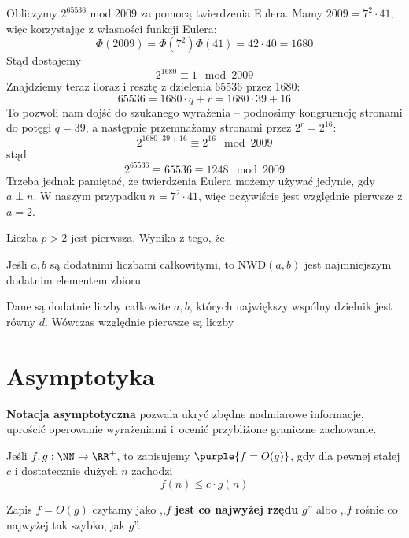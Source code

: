 \begin{example}
    Obliczymy $2^{65536}$ mod 2009 za pomocą twierdzenia Eulera. Mamy $2009 = 7^2\cdot41$, więc korzystając z własności funkcji Eulera:
    $$\Phi(2009)=\Phi(7^2)\Phi(41)=42\cdot40=1680$$
    Stąd dostajemy
    $$2^{1680}\equiv1\mod{2009}$$
    Znajdziemy teraz iloraz i resztę z dzielenia 65536 przez 1680:
    $$65536=1680\cdot q+r=1680\cdot39+16$$
    To pozwoli nam dojść do szukanego wyrażenia -- podnosimy kongruencję stronami do potęgi $q=39$, a następnie przemnażamy stronami przez $2^r=2^{16}$:
    $$2^{1680\cdot39+16}\equiv2^{16}\mod{2009}$$
    stąd
    $$2^{65536}\equiv65536\equiv1248\mod{2009}$$
    Trzeba jednak pamiętać, że twierdzenia Eulera możemy używać jedynie, gdy $a\perp n$. W naszym przypadku $n=7^2\cdot41$, więc oczywiście jest względnie pierwsze z $a=2$.
\end{example}

\begin{problems}
    \prob Liczba $p > 2$ jest pierwsza. Wynika z tego, że

    \prob Jeśli $a, b$ są dodatnimi liczbami całkowitymi, to $\mathrm{NWD}(a,b)$ jest najmniejszym dodatnim elementem zbioru

    \prob Dane są dodatnie liczby całkowite $a, b$, których największy wspólny dzielnik jest równy $d$. Wówczas względnie pierwsze są liczby
\end{problems}

\section{Asymptotyka}

\textbf{Notacja asymptotyczna} pozwala ukryć zbędne nadmiarowe informacje, uprościć operowanie wyrażeniami i~ocenić przybliżone graniczne zachowanie.

Jeśli $f, g : \NN \to \RR^+$, to zapisujemy $\purple{f = O(g)}$, gdy dla pewnej stałej $c$ i dostatecznie dużych $n$ zachodzi
$$f(n) \leq c \cdot g(n)$$

Zapis $f = O(g)$ czytamy jako ,,$f$ \textbf{jest co najwyżej rzędu} $g$'' albo ,,$f$ rośnie co najwyżej tak szybko, jak $g$''.


